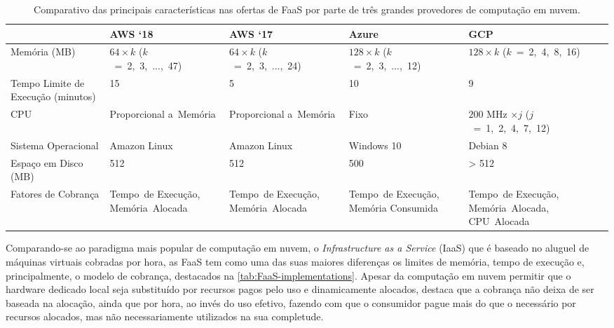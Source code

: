 \documentclass[english,brazilian]{UNISINOSmonografia} %
\newcommand\defaultFigureWidth{0.9}
\renewcommand{\arraystretch}{1.3}
\begin{document}
\begin{table}[tb]
\centering%
\begin{minipage}{\defaultFigureWidth\textwidth}
	\caption{Comparativo das principais características nas ofertas de FaaS por parte de três grandes provedores de computação em nuvem.}
	\label{tab:FaaS-implementations}
	\small
	\vspace{1ex}
	\renewcommand\arraystretch{1.4}
	\renewcommand {\tabularxcolumn}[1]{>{\arraybackslash}m{#1}}
	\begin{tabularx}{\textwidth}{@{}WYYYY@{}}
		\toprule
		& {AWS \textquoteleft18} & {AWS \textquoteleft17} & {Azure} & {GCP} \\ 
		\midrule
		{Memória (MB)} & $ 64 \times k $ ($k$~=~2,~3,~...,~47) & $ 64 \times k $ ($k$~=~2,~3,~...,~24) & $ 128 \times k $ ($k$~=~2,~3,~...,~12) & $ 128 \times k $ ($k$~=~2,~4,~8,~16) \\
		{Tempo Limite de Execução (minutos)} & 15 & 5 & 10 & 9 \\
		{CPU} & Proporcional a~Memória & Proporcional a~Memória & Fixo & $ 200 $ MHz $ \times j $ ($j$~=~1,~2,~4,~7,~12) \\
		{Sistema Operacional} & Amazon Linux & Amazon Linux & Windows 10 & Debian 8 \\
		{Espaço em Disco (MB)} & 512 & 512 & 500 & > 512 \\
		{Fatores de Cobrança} & {\footnotesize Tempo~de Execução, Memória~Alocada} & {\footnotesize Tempo~de Execução, Memória~Alocada} & {\footnotesize Tempo~de Execução, Memória Consumida} & {\footnotesize Tempo~de Execução, Memória~Alocada, CPU~Alocada} \\ 
		\bottomrule	\end{tabularx}
\end{minipage}
\end{table}


Comparando-se ao paradigma mais popular de computação em nuvem, o \textit{Infrastructure as a Service} (IaaS) que é baseado no aluguel de máquinas virtuais cobradas por hora, as FaaS tem como uma das suas maiores diferenças os limites de memória, tempo de execução e, principalmente, o modelo de cobrança, destacados na \autoref{tab:FaaS-implementations}. 
Apesar da computação em nuvem permitir que o hardware dedicado local seja substituído por recursos pagos pelo uso e dinamicamente alocados,  destaca que a cobrança não deixa de ser baseada na alocação, ainda que por hora, ao invés do uso efetivo, fazendo com que o consumidor pague mais do que o necessário por recursos alocados, mas não necessariamente utilizados na sua completude.
\end{document}
